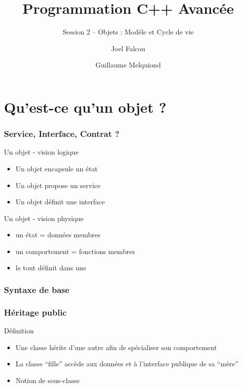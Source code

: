 \documentclass[svgnames]{beamer}
\title{Programmation C++ Avancée}
\subtitle{Session 2 -- Objets : Modèle et Cycle de vie}
\author{Joel Falcou \and Guillaume Melquiond}
\institute{Laboratoire de Recherche en Informatique}
\date{}
\begin{document}


\begin{frame}[plain]
\titlepage
\end{frame}
\setcounter{framenumber}{0}

\section{Qu'est-ce qu'un objet ?}

\frame
{
  \frametitle{Service, Interface, Contrat ?}
  \begin{block}{Un objet - vision logique}
  \begin{itemize}
  \item Un objet encapsule un état
  \item Un objet propose un service
  \item Un objet définit une interface
  \end{itemize}
  \end{block}{}
  
  \begin{block}{Un objet - vision physique}
  \begin{itemize}
  \item un état = données membres
  \item un comportement = fonctions membres
  \item le tout définit dans une 
  \end{itemize}
  \end{block}{}
}

\frame
{
  \frametitle{Syntaxe de base}
}
 
\frame
{
  \frametitle{Héritage public}
  \begin{block}{Définition}
  \begin{itemize}
  \footnotesize
  \item Une classe hérite d'une autre afin de spécialiser son comportement
  \item La classe ``fille'' accède aux données et à l'interface publique de sa ``mère''
  \item Notion de sous-classe
  \end{itemize}

  \begin{overlayarea}{\textwidth}{4cm}
  \end{overlayarea}
  \end{block}
}
\end{document}
